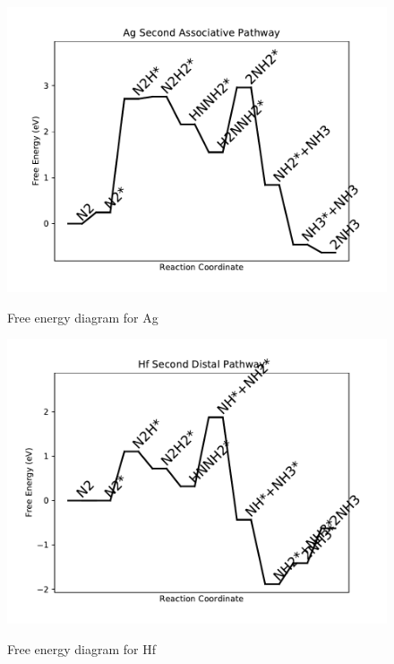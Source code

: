\documentclass{article}
\begin{document}
\begin{figure}
\includegraphics[width=1\linewidth]{data/plots/Ag_associative_2.pdf}
\label{fig:Ag_associative_2}
\caption{Free energy diagram for Ag}
\end{figure}

\begin{figure}
\includegraphics[width=1\linewidth]{data/plots/Hf_distal_2.pdf}
\label{fig:Hf_distal_2}
\caption{Free energy diagram for Hf}
\end{figure}
\end{document}
